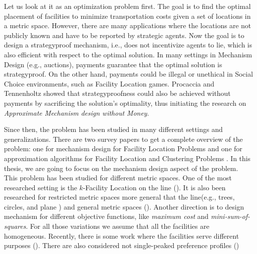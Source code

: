 Let us look at it as an optimization problem first. The goal is to find the optimal placement of facilities to minimize transportation costs given a set of locations in a metric space. However, there are many applications where the locations are not publicly known and have to be reported by strategic agents. Now the goal is to design a strategyproof mechanism, i.e., does not incentivize agents to lie, which is also efficient with respect to the optimal solution. In many settings in Mechanism Design (e.g., auctions), payments guarantee that the optimal solution is strategyproof. On the other hand, payments could be illegal or unethical in Social Choice environments, such as Facility Location games\cite{SV07}. Procaccia and Tennenholtz \cite{Procaccia2013} showed that strategyproofness could also be achieved without payments by sacrificing the solution's optimality, thus initiating the research on \emph{Approximate Mechanism design without Money}.

Since then, the problem has been studied in many different settings and generalizations. There are two survey papers to get a complete overview of the problem: one for mechanism design for Facility Location Problems \cite{Chan2021} and one for approximation algorithms for Facility Location and Clustering Problems \cite{An2017}. In this thesis, we are going to focus on the mechanism design aspect of the problem. This problem has been studied for different metric spaces. One of the most researched setting is the $k$-Facility Location on the line (\cite{Fotakis2014,Fotakis2013sp,GolombT17,Lu2009,Nissim2010}).  It is also been researched for restricted metric spaces more general that the line(e.g., trees, circles, and plane \cite{Alon2010,Dokow2012,Filimonov2021,Goel2020,Meir2019}) and general metric spaces (\cite{Fotakis2013, Lu2010}). Another direction is to design mechanism for different objective functions, like \emph{maximum cost} \cite{Procaccia2013,Fotakis2013sp} and \emph{mini-sum-of-squares}\cite{Feldman2011}. For all those variations we assume that all the facilities are homogeneous. Recently, there is some work where the facilities serve different purposes (\cite{Li2021,Kyropoulou2019,Serafino2016}). There are also considered not single-peaked preference profiles   (\cite{MeiLYZ19,CHEN2020185,Feigenbaum2020})



